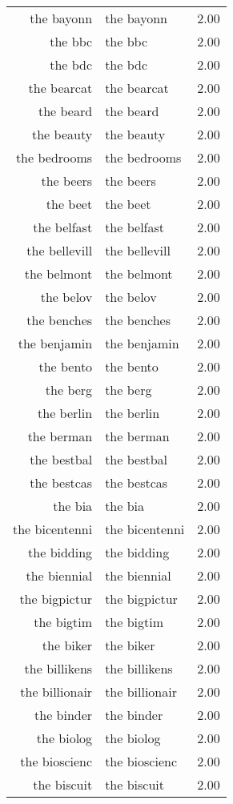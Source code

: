 \begin{table}[ht]
\begin{tabular}{rlr}
  the bayonn & the bayonn & 2.00 \\ 
  the bbc & the bbc & 2.00 \\ 
  the bdc & the bdc & 2.00 \\ 
  the bearcat & the bearcat & 2.00 \\ 
  the beard & the beard & 2.00 \\ 
  the beauty & the beauty & 2.00 \\ 
  the bedrooms & the bedrooms & 2.00 \\ 
  the beers & the beers & 2.00 \\ 
  the beet & the beet & 2.00 \\ 
  the belfast & the belfast & 2.00 \\ 
  the bellevill & the bellevill & 2.00 \\ 
  the belmont & the belmont & 2.00 \\ 
  the belov & the belov & 2.00 \\ 
  the benches & the benches & 2.00 \\ 
  the benjamin & the benjamin & 2.00 \\ 
  the bento & the bento & 2.00 \\ 
  the berg & the berg & 2.00 \\ 
  the berlin & the berlin & 2.00 \\ 
  the berman & the berman & 2.00 \\ 
  the bestbal & the bestbal & 2.00 \\ 
  the bestcas & the bestcas & 2.00 \\ 
  the bia & the bia & 2.00 \\ 
  the bicentenni & the bicentenni & 2.00 \\ 
  the bidding & the bidding & 2.00 \\ 
  the biennial & the biennial & 2.00 \\ 
  the bigpictur & the bigpictur & 2.00 \\ 
  the bigtim & the bigtim & 2.00 \\ 
  the biker & the biker & 2.00 \\ 
  the billikens & the billikens & 2.00 \\ 
  the billionair & the billionair & 2.00 \\ 
  the binder & the binder & 2.00 \\ 
  the biolog & the biolog & 2.00 \\ 
  the bioscienc & the bioscienc & 2.00 \\ 
  the biscuit & the biscuit & 2.00 \\ 

\end{tabular}
\end{table}

